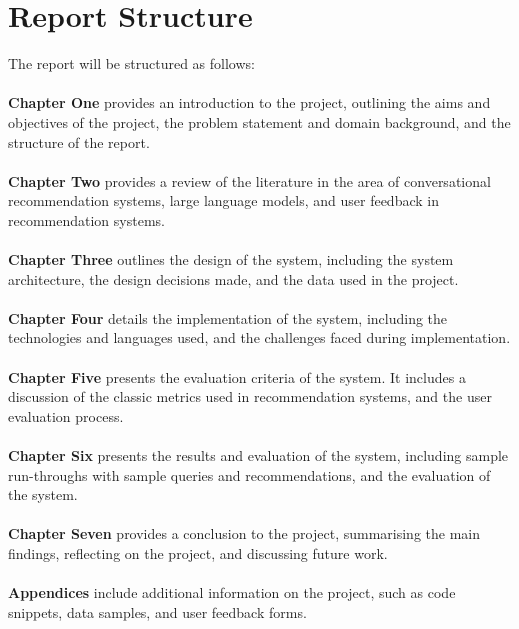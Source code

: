 \section{Report Structure}
\label{sec:report_structure}
The report will be structured as follows:
\\\\
\textbf{Chapter One} provides an introduction to the project, outlining the aims and objectives of the project, the problem statement and domain background, and the structure of the report.
\\\\
\textbf{Chapter Two} provides a review of the literature in the area of conversational recommendation systems, large language models, and user feedback in recommendation systems.
\\\\
\textbf{Chapter Three} outlines the design of the system, including the system architecture, the design decisions made, and the data used in the project.
\\\\
\textbf{Chapter Four} details the implementation of the system, including the technologies and languages used, and the challenges faced during implementation.
\\\\
\textbf{Chapter Five} presents the evaluation criteria of the system. It includes a discussion of the classic metrics used in recommendation systems, and the user evaluation process.
\\\\
\textbf{Chapter Six} presents the results and evaluation of the system, including sample run-throughs with sample queries and recommendations, and the evaluation of the system.
\\\\
\textbf{Chapter Seven} provides a conclusion to the project, summarising the main findings, reflecting on the project, and discussing future work.
\\\\
\textbf{Appendices} include additional information on the project, such as code snippets, data samples, and user feedback forms.

    
    
